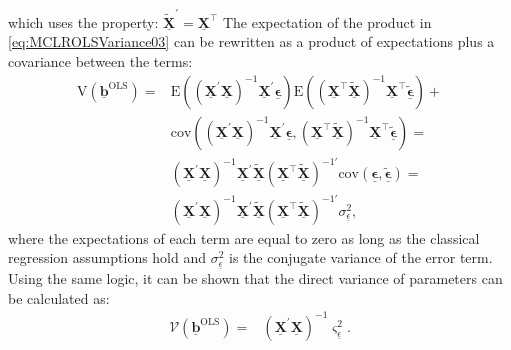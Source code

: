 \documentclass[
]{book}
\begin{document}
which uses the property: \(\tilde{\underline{\mathbf{X}}}^\prime = \underline{\mathbf{X}}^\top\)
The expectation of the product in \eqref{eq:MCLROLSVariance03} can be rewritten as a product of expectations plus a covariance between the terms:
\begin{equation}
    \begin{aligned}
        \mathrm{V}\left( \underline{\boldsymbol{b}}^{\text{OLS}} \right) =
        & \mathrm{E}\left( \left( \underline{\mathbf{X}}^\prime \underline{\mathbf{X}} \right)^{-1} \underline{\mathbf{X}}^\prime \underline{\boldsymbol{\epsilon}} \right) \mathrm{E}\left( \left( {\underline{\mathbf{X}}}^\top \tilde{\underline{\mathbf{X}}} \right)^{-1} {\underline{\mathbf{X}}}^\top \tilde{\underline{\boldsymbol{\epsilon}}} \right) + \\
        & \mathrm{cov}\left(\left( \underline{\mathbf{X}}^\prime \underline{\mathbf{X}} \right)^{-1} \underline{\mathbf{X}}^\prime \underline{\boldsymbol{\epsilon}}, \left( {\underline{\mathbf{X}}}^\top \tilde{\underline{\mathbf{X}}} \right)^{-1} {\underline{\mathbf{X}}}^\top \tilde{\underline{\boldsymbol{\epsilon}}} \right) = \\
        & \left( \underline{\mathbf{X}}^\prime \underline{\mathbf{X}} \right)^{-1} \underline{\mathbf{X}}^\prime \tilde{\underline{\mathbf{X}}} \left( {\underline{\mathbf{X}}}^\top \tilde{\underline{\mathbf{X}}} \right)^{-1 \prime}  \mathrm{cov}\left( \underline{\boldsymbol{\epsilon}}, \tilde{\underline{\boldsymbol{\epsilon}}} \right) = \\
        & \left( \underline{\mathbf{X}}^\prime \underline{\mathbf{X}} \right)^{-1} \underline{\mathbf{X}}^\prime \tilde{\underline{\mathbf{X}}} \left( {\underline{\mathbf{X}}}^\top \tilde{\underline{\mathbf{X}}} \right)^{-1 \prime}  \sigma_{\underline{\epsilon}}^2 ,
    \end{aligned}
    \label{eq:MCLROLSConjVar}
\end{equation}
where the expectations of each term are equal to zero as long as the classical regression assumptions hold and \(\sigma_{\underline{\epsilon}}^2\) is the conjugate variance of the error term. Using the same logic, it can be shown that the direct variance of parameters can be calculated as:
\begin{equation}
    \begin{aligned}
        \mathcal{V}\left( \underline{\boldsymbol{b}}^{\text{OLS}} \right) =
        & \left( \underline{\mathbf{X}}^\prime \underline{\mathbf{X}} \right)^{-1} \varsigma_{\underline{\epsilon}}^2 .
    \end{aligned}
    \label{eq:MCLROLSDirVar}
\end{equation}
\end{document}
